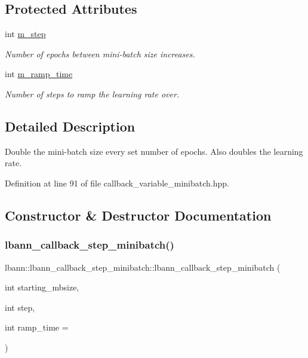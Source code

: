 \subsection*{Protected Attributes}
\begin{DoxyCompactItemize}
\item 
int \hyperlink{classlbann_1_1lbann__callback__step__minibatch_a1d150c95b193f9a24c8d7d73506b034c}{m\+\_\+step}
\begin{DoxyCompactList}\small\item\em Number of epochs between mini-\/batch size increases. \end{DoxyCompactList}\item 
int \hyperlink{classlbann_1_1lbann__callback__step__minibatch_ad367d8969b52755f768085d8db98449c}{m\+\_\+ramp\+\_\+time}
\begin{DoxyCompactList}\small\item\em Number of steps to ramp the learning rate over. \end{DoxyCompactList}\end{DoxyCompactItemize}


\subsection{Detailed Description}
Double the mini-\/batch size every set number of epochs. Also doubles the learning rate. 

Definition at line 91 of file callback\+\_\+variable\+\_\+minibatch.\+hpp.



\subsection{Constructor \& Destructor Documentation}
\mbox{\label{classlbann_1_1lbann__callback__step__minibatch_a2ce11bed6c3a4d526c2fdd885970f49d}} 
\subsubsection{\texorpdfstring{lbann\+\_\+callback\+\_\+step\+\_\+minibatch()}{lbann\_callback\_step\_minibatch()}\hspace{0.1cm}{\footnotesize\ttfamily [1/2]}}
{\footnotesize\ttfamily lbann\+::lbann\+\_\+callback\+\_\+step\+\_\+minibatch\+::lbann\+\_\+callback\+\_\+step\+\_\+minibatch (\begin{DoxyParamCaption}\item[{int}]{starting\+\_\+mbsize,  }\item[{int}]{step,  }\item[{int}]{ramp\+\_\+time = {} }\end{DoxyParamCaption})}




